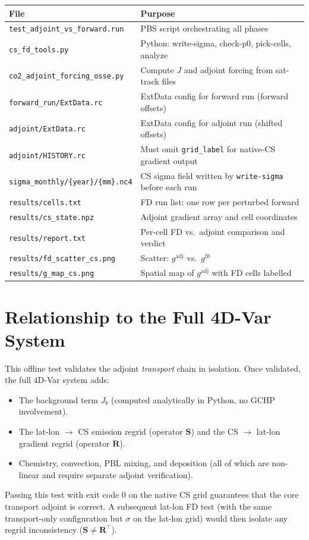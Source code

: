 \documentclass[12pt]{article}
\newcommand{\gadj}{g^{\mathrm{adj}}}
\newcommand{\gfit}{g^{\mathrm{fit}}}
\begin{document}
\begin{table}[h!]
\centering
\begin{tabular}{ll}
\toprule
File & Purpose \\
\midrule
\texttt{test\_adjoint\_vs\_forward.run}
  & PBS script orchestrating all phases \\
\texttt{cs\_fd\_tools.py}
  & Python: write-sigma, check-p0, pick-cells, analyze \\
\texttt{co2\_adjoint\_forcing\_osse.py}
  & Compute $J$ and adjoint forcing from sat-track files \\
\texttt{forward\_run/ExtData.rc}
  & ExtData config for forward run (forward offsets) \\
\texttt{adjoint/ExtData.rc}
  & ExtData config for adjoint run (shifted offsets) \\
\texttt{adjoint/HISTORY.rc}
  & Must omit \texttt{grid\_label} for native-CS gradient output \\
\texttt{sigma\_monthly/\{year\}/\{mm\}.nc4}
  & CS sigma field written by \texttt{write-sigma} before each run \\
\texttt{results/cells.txt}
  & FD run list: one row per perturbed forward \\
\texttt{results/cs\_state.npz}
  & Adjoint gradient array and cell coordinates \\
\texttt{results/report.txt}
  & Per-cell FD vs.\ adjoint comparison and verdict \\
\texttt{results/fd\_scatter\_cs.png}
  & Scatter: $\gadj$ vs.\ $\gfit$ \\
\texttt{results/g\_map\_cs.png}
  & Spatial map of $\gadj$ with FD cells labelled \\
\bottomrule
\end{tabular}
\end{table}

\section{Relationship to the Full 4D-Var System}

This offline test validates the adjoint \emph{transport} chain in isolation.
Once validated, the full 4D-Var system adds:
\begin{itemize}
  \item The background term $J_b$ (computed analytically in Python, no GCHP
        involvement).
  \item The lat-lon $\to$ CS emission regrid (operator $\mathbf{S}$) and the
        CS $\to$ lat-lon gradient regrid (operator $\mathbf{R}$).
  \item Chemistry, convection, PBL mixing, and deposition (all of which are
        non-linear and require separate adjoint verification).
\end{itemize}
Passing this test with exit code 0 on the native CS grid guarantees that the
core transport adjoint is correct.  A subsequent lat-lon FD test (with the
same transport-only configuration but $\sigma$ on the lat-lon grid) would
then isolate any regrid inconsistency ($\mathbf{S} \neq \mathbf{R}^\top$).
\end{document}
